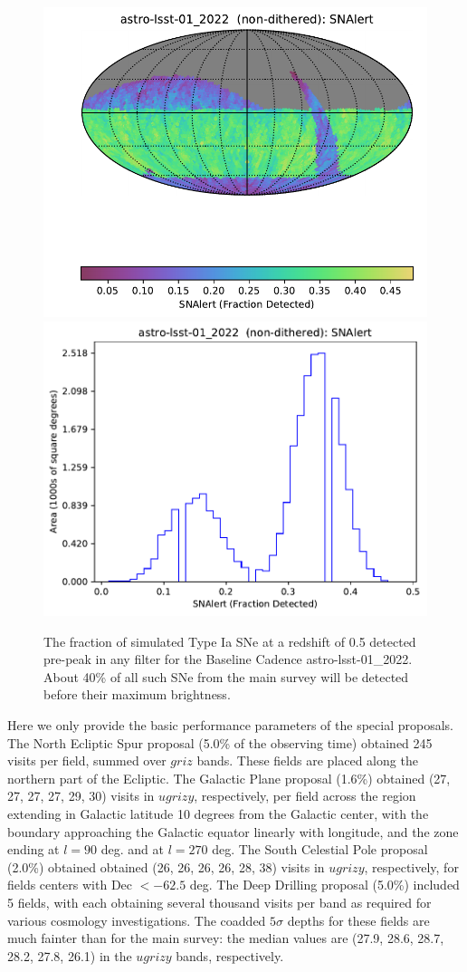 \documentclass[DM,lsstdraft,authoryear,toc]{lsstdoc}
\begin{document}
\begin{figure}[h!]
\vskip -0.0in
\includegraphics[angle=0,width=0.49\hsize,clip]{figures/astro-lsst-01_2022_SNAlert_non-dithered_HEAL_SkyMap.pdf}
\includegraphics[angle=0,width=0.49\hsize,clip]{figures/astro-lsst-01_2022_SNAlert_non-dithered_HEAL_Histogram.pdf}
\vskip -0.1in

\caption{The fraction of simulated Type Ia SNe at a redshift of 0.5 detected
pre-peak in any filter for the Baseline Cadence astro-lsst-01\_2022. About
40\% of all such SNe from the main survey will be detected before their
maximum brightness.}
\label{fig:baseline_EarlySNe}
\end{figure}

Here we only provide the basic
performance parameters of the special proposals. The
North Ecliptic Spur proposal (5.0\% of the observing time) obtained  245 visits per field, summed over $griz$ bands. These
fields are placed along the northern part of the Ecliptic. The
Galactic Plane proposal (1.6\%) obtained (27, 27, 27, 27, 29, 30) visits in $ugrizy$, respectively, per field
across the region extending in Galactic latitude 10 degrees
from the Galactic center, with the boundary approaching the Galactic
equator linearly with longitude, and the zone ending at $l=90$ deg.
and at $l=270$ deg. The South Celestial Pole proposal (2.0\%) obtained
obtained (26, 26, 26, 26, 28, 38) visits in $ugrizy$, respectively, for fields centers with Dec $<
-62.5$ deg. The Deep Drilling proposal (5.0\%) included 5
fields, with each obtaining several thousand visits per band as required for various cosmology investigations. The
coadded $5\sigma$ depths for these fields are much fainter than for
the main survey: the median values are (27.9, 28.6, 28.7, 28.2, 27.8,
26.1) in the $ugrizy$ bands, respectively.


\end{document}
